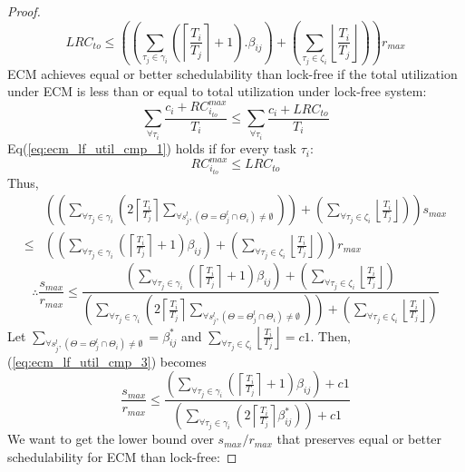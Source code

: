 \begin{proof}
%
\begin{equation}
LRC_{to} \le \left(\left(\sum_{\tau_{j}\in\gamma_{i}}\left(\left\lceil\frac{T_{i}}{T_{j}}\right\rceil+1\right).\beta_{ij}\right) + \left(\sum_{\tau_j \in \zeta_i}\left\lfloor\frac{T_i}{T_j}\right\rfloor \right) \right) r_{max}
\label{eq:lf_total_rc}
\end{equation}
%
ECM achieves equal or better schedulability than lock-free if the total utilization under ECM is less than or equal to total utilization under lock-free system:
%
\begin{equation}
\sum_{\forall \tau_{i}}\frac{c_{i} + RC_{i_{to}}^{max}} {T_{i}} \le \sum_{\forall \tau_{i}}\frac{c_{i}+LRC_{to}}{T_{i}}
\label{eq:ecm_lf_util_cmp_1}
\end{equation}
%
Eq(\ref{eq:ecm_lf_util_cmp_1}) holds if for every task $\tau_i$:
%
\begin{equation}
RC_{i_{to}}^{max} \le LRC_{to}
\label{eq:ecm_lf_util_cmp_2}
\end{equation}
%
Thus,
\begin{eqnarray*}
 & \left(\left(\sum_{\forall\tau_{j}\in\gamma_{i}}\left(2\left\lceil \frac{T_{i}}{T_{j}}\right\rceil \sum_{\forall s_{j}^{l},\left(\Theta=\Theta_{j}^{l}\cap\Theta_{i}\right)\neq\emptyset}\right)\right)+\left(\sum_{\forall\tau_{j}\in\zeta_{i}}\left\lfloor \frac{T_{i}}{T_{j}}\right\rfloor \right)\right)s_{max}\\
\le & \left(\left(\sum_{\forall\tau_{j}\in\gamma_{i}}\left(\left\lceil \frac{T_{i}}{T_{j}}\right\rceil +1\right)\beta_{ij}\right)+\left(\sum_{\forall\tau_{j}\in\zeta_{i}}\left\lfloor \frac{T_{i}}{T_{j}}\right\rfloor \right)\right)r_{max}
\end{eqnarray*}
%
\begin{equation}
\therefore \frac{s_{max}}{r_{max}}\le\frac{\left(\sum_{\forall\tau_{j}\in\gamma_{i}}\left(\left\lceil \frac{T_{i}}{T_{j}}\right\rceil +1\right)\beta_{ij}\right)+\left(\sum_{\forall\tau_{j}\in\zeta_{i}}\left\lfloor \frac{T_{i}}{T_{j}}\right\rfloor \right)}{\left(\sum_{\forall\tau_{j}\in\gamma_{i}}\left(2\left\lceil \frac{T_{i}}{T_{j}}\right\rceil \sum_{\forall s_{j}^{l},\left(\Theta=\Theta_{j}^{l}\cap\Theta_{i}\right)\neq\emptyset}\right)\right)+\left(\sum_{\forall\tau_{j}\in\zeta_{i}}\left\lfloor \frac{T_{i}}{T_{j}}\right\rfloor \right)}
\label{eq:ecm_lf_util_cmp_3}
\end{equation}
%
Let $\sum_{\forall s_{j}^{l},\left(\Theta=\Theta_{j}^{l}\cap\Theta_{i}\right)\neq\emptyset}=\beta_{ij}^{*}$
and $\sum_{\forall\tau_{j}\in\zeta_{i}}\left\lfloor \frac{T_{i}}{T_{j}}\right\rfloor =c1$.
Then, (\ref{eq:ecm_lf_util_cmp_3}) becomes 
%
\begin{equation}
\frac{s_{max}}{r_{max}}\le\frac{\left(\sum_{\forall\tau_{j}\in\gamma_{i}}\left(\left\lceil \frac{T_{i}}{T_{j}}\right\rceil +1\right)\beta_{ij}\right)+c1}{\left(\sum_{\forall\tau_{j}\in\gamma_{i}}\left(2\left\lceil \frac{T_{i}}{T_{j}}\right\rceil \beta_{ij}^{*}\right)\right)+c1}
\label{eq:ecm_lf_util_cmp_4}
\end{equation}
%
We want to get the lower bound over $s_{max}/r_{max}$ that preserves equal or better schedulability for ECM than lock-free:


\end{proof}
